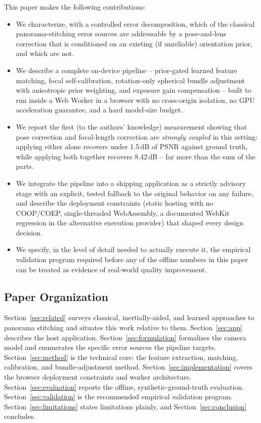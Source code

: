 \documentclass[11pt]{article}
\begin{document}
This paper makes the following contributions:

\begin{itemize}
\item We characterize, with a controlled error decomposition, which of the classical panorama-stitching error sources are addressable by a pose-and-lens correction that is conditioned on an existing (if unreliable) orientation prior, and which are not.
\item We describe a complete on-device pipeline -- prior-gated learned feature matching, focal self-calibration, rotation-only spherical bundle adjustment with anisotropic prior weighting, and exposure gain compensation -- built to run inside a Web Worker in a browser with no cross-origin isolation, no GPU acceleration guarantee, and a hard model-size budget.
\item We report the first (to the authors' knowledge) measurement showing that pose correction and focal-length correction are \emph{strongly coupled} in this setting: applying either alone recovers under 1.5\,dB of PSNR against ground truth, while applying both together recovers 8.42\,dB -- far more than the sum of the parts.
\item We integrate the pipeline into a shipping application as a strictly advisory stage with an explicit, tested fallback to the original behavior on any failure, and describe the deployment constraints (static hosting with no COOP/COEP, single-threaded WebAssembly, a documented WebKit regression in the alternative execution provider) that shaped every design decision.
\item We specify, in the level of detail needed to actually execute it, the empirical validation program required before any of the offline numbers in this paper can be treated as evidence of real-world quality improvement.
\end{itemize}

\subsection{Paper Organization}

Section~\ref{sec:related} surveys classical, inertially-aided, and learned approaches to panorama stitching and situates this work relative to them. Section~\ref{sec:app} describes the host application. Section~\ref{sec:formulation} formalizes the camera model and enumerates the specific error sources the pipeline targets. Section~\ref{sec:method} is the technical core: the feature extraction, matching, calibration, and bundle-adjustment method. Section~\ref{sec:implementation} covers the browser deployment constraints and worker architecture. Section~\ref{sec:evaluation} reports the offline, synthetic-ground-truth evaluation. Section~\ref{sec:validation} is the recommended empirical validation program. Section~\ref{sec:limitations} states limitations plainly, and Section~\ref{sec:conclusion} concludes.
\end{document}
